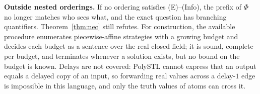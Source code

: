 \documentclass[10pt]{article}
\theoremstyle{plain}\newtheorem{theorem}{Theorem}\newtheorem{lemma}{Lemma}
\theoremstyle{definition}\newtheorem{definition}{Definition}
\begin{document}
\textbf{Outside nested orderings.} If no ordering satisfies (E)--(Info), the prefix of $\Phi$ no longer matches who sees what, and the exact question has branching quantifiers. Theorem~\ref{thm:nec} still refutes. For construction, the available procedure enumerates piecewise-affine strategies with a growing budget and decides each budget as a sentence over the real closed field; it is sound, complete per budget, and terminates whenever a solution exists, but no bound on the budget is known. Delays are not covered: PolySTL cannot express that an output equals a delayed copy of an input, so forwarding real values across a delay-$1$ edge is impossible in this language, and only the truth values of atoms can cross it.
\end{document}
